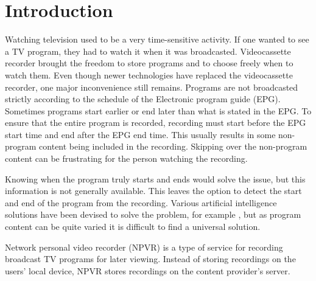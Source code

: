 \section{Introduction} \label{sec:intro}

Watching television used to be a very time-sensitive activity. If one wanted to see a TV program, they had to watch it when it was broadcasted. Videocassette recorder brought the freedom to store programs and to choose freely when to watch them. Even though newer technologies have replaced the videocassette recorder, one major inconvenience still remains. Programs are not broadcasted strictly according to the schedule of the Electronic program guide (EPG). Sometimes programs start earlier or end later than what is stated in the EPG. To ensure that the entire program is recorded, recording must start before the EPG start time and end after the EPG end time. %
This usually results in some non-program content being included in the recording. Skipping over the non-program content can be frustrating for the person watching the recording.

Knowing when the program truly starts and ends would solve the issue, but this information is not generally available. %
This leaves the option to detect the start and end of the program from the recording. Various artificial intelligence solutions have been devised to solve the problem, for example \cite{berraniNonsupervisedApproachRepeated2008} \cite{ibrahimTVStreamStructuring2011} \cite{kompatsiarisTVContentAnalysis2012} \cite{mansonAutomaticTVBroadcast2010}, but as program content can be quite varied it is difficult to find a universal solution. 


Network personal video recorder (NPVR) is a type of service for recording broadcast TV programs for later viewing. Instead of storing recordings on the users' local device, NPVR stores recordings on the content provider's server. %

